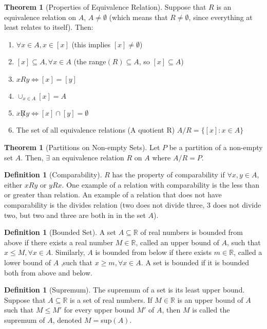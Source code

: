 \documentclass[10pt]{article}
\theoremstyle{definition}
\newtheorem{definition}[equation]{Definition}
\newtheorem{theorem}[equation]{Theorem}
\newcommand{\R}{\mathbb{R}}
\begin{document}
\begin{theorem}[Properties of Equivalence Relation]
  Suppose that $R$ is an equivalence relation on $A$, $A\neq\emptyset$ (which means that $R\neq\emptyset$, since everything at least relates to itself). Then:
  \begin{enumerate}
    \item $\forall x\in A, x\in[x]$ (this implies $[x]\neq \emptyset$)
    \item $[x] \subseteq A, \forall x\in A$ (the range$(R)\subseteq A$, so $[x]\subseteq A$)
    \item $xRy \iff [x]=[y]$
    \item $\cup_{x\in A} [x] = A$
    \item $x\not Ry \iff [x]\cap [y] = \emptyset$
    \item The set of all equivalence relations (A quotient R) $A/R = \{[x]:x\in A\}$
  \end{enumerate}
\end{theorem}

\begin{theorem}[Partitions on Non-empty Sets]
  Let $P$ be a partition of a non-empty set $A$. Then, $\exists$ an equivalence relation $R$ on $A$ where $A/R=P$.
\end{theorem}

\begin{definition}[Comparability]
  $R$ has the property of comparability if $\forall x,y\in A$, either $xRy$ or $yRx$. One example of a relation with comparability is the less than or greater than relation. An example of a relation that does not have comparability is the divides relation (two does not divide three, 3 does not divide two, but two and three are both in in the set $A$).
\end{definition}

\begin{definition}[Bounded Set]
  A set $A\subseteq\R$ of real numbers is bounded from above if there exists a real number $M\in\R$, called an upper bound of $A$, such that $x\leq M, \forall x\in A$. Similarly, $A$ is bounded from below if there exists $m\in\R$, called a lower bound of $A$ ,such that $x\geq m,\forall x\in A$. A set is bounded if it is bounded both from above and below.
\end{definition}

\begin{definition}[Supremum]
  The supremum of a set is its least upper bound. Suppose that $A\subseteq\R$ is a set of real numbers. If $M\in\R$ is an upper bound of $A$ such that $M\leq M′$ for every upper bound $M′$ of $A$, then $M$ is called the supremum of $A$, denoted $M = $sup$(A)$.
\end{definition}
\end{document}

